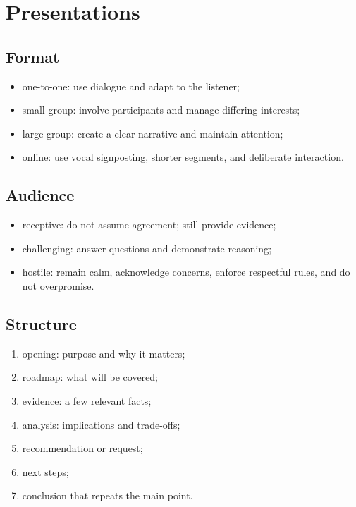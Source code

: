 \documentclass[11pt,letterpaper,oneside,openany]{book}
\begin{document}
\section[Presentations]{Presentations}
\subsection[Format]{Format}
\begin{itemize}
\item one-to-one: use dialogue and adapt to the listener;
\item small group: involve participants and manage differing interests;
\item large group: create a clear narrative and maintain attention;
\item online: use vocal signposting, shorter segments, and deliberate interaction.
\end{itemize}


\subsection[Audience]{Audience}
\begin{itemize}
\item receptive: do not assume agreement; still provide evidence;
\item challenging: answer questions and demonstrate reasoning;
\item hostile: remain calm, acknowledge concerns, enforce respectful rules, and do not overpromise.
\end{itemize}


\subsection[Structure]{Structure}
\begin{enumerate}
\item opening: purpose and why it matters;
\item roadmap: what will be covered;
\item evidence: a few relevant facts;
\item analysis: implications and trade-offs;
\item recommendation or request;
\item next steps;
\item conclusion that repeats the main point.
\end{enumerate}
\end{document}
